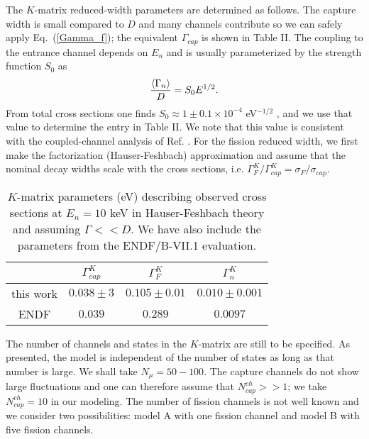\documentclass[prl,aps,floatfix,nofootinbib,preprint]{revtex4}
\def\be{\begin{equation}}
\def\ee{\end{equation}}
\begin{document}
The $K$-matrix reduced-width parameters are determined as follows.
The
capture width is small compared to $D$ and many channels contribute so we 
can safely apply Eq.~(\ref{Gamma_f}); the equivalent $\Gamma_{cap}$ is shown in
Table II. The coupling to the
entrance channel depends on $E_n$ 
and is usually parameterized by the strength function
$S_0$ as
\be
{\langle \Gamma_n \rangle \over D}  = S_0  E^{1/2}.
\ee
From total cross sections one finds $S_0 \approx 1\pm0.1\times10^{-4}$ eV$^{-1/2}$
\cite{mo78,mug},\cite[Fig. 47]{ko03} and we use that value to determine 
the entry in Table II.  We note that this value is consistent with the
coupled-channel analysis of Ref. \cite{so05}.  For the fission reduced
width, we first make the factorization (Hauser-Feshbach) approximation and  
assume that the nominal decay widths scale with the cross sections, i.e.
$\Gamma^K_F/\Gamma^K_{cap}= \sigma_{F}/\sigma_{cap}$.
%
\begin{table}[htb] 
\caption{ $K$-matrix parameters (eV) describing observed  
cross sections 
at $E_n = 10 $ keV in Hauser-Feshbach theory 
and assuming  $\Gamma << D$.  We have also include the parameters from
the ENDF/B-VII.1 evaluation.
}
\label{K-parameters2}
\begin{tabular}{|c|ccc|} 
\hline 
     &   $\Gamma^K_{cap}$    & $\Gamma^K_F$   & ${\Gamma^K_n}$   \\
\hline
this work &   $  0.038\pm 3$    & $ 0.105\pm0.01$  &  $0.010\pm0.001 $\\ 
 ENDF   & $  0.039 $    & $ 0.289$  &  $0.0097 $\\ 
\hline 
\end{tabular} 
\end{table} 
 
The number of channels and states in the $K$-matrix are still to be 
specified.  As presented, the model is independent of the number
of states as long as that number is large.  We shall
take $N_\mu=50-100$.  The capture channels do not show large fluctuations
and one can therefore assume that $N^{ch}_{cap}>>1$; we take
$N^{ch}_{cap} = 10$ in our modeling.
The number of fission
channels is not well known { \cite{si16}} and we consider two possibilities:  model A with
one fission channel and model B with five fission channels.  
\end{document}
